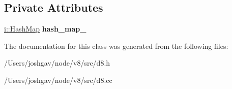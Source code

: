 \subsection*{Private Attributes}
\begin{DoxyCompactItemize}
\item 
\hyperlink{classv8_1_1internal_1_1_template_hash_map_impl}{i\+::\+Hash\+Map} {\bfseries hash\+\_\+map\+\_\+}\hypertarget{classv8_1_1_counter_map_a741c50ebc8a6c30a3af5c63097f2b0cd}{}\label{classv8_1_1_counter_map_a741c50ebc8a6c30a3af5c63097f2b0cd}

\end{DoxyCompactItemize}


The documentation for this class was generated from the following files\+:\begin{DoxyCompactItemize}
\item 
/\+Users/joshgav/node/v8/src/d8.\+h\item 
/\+Users/joshgav/node/v8/src/d8.\+cc\end{DoxyCompactItemize}
